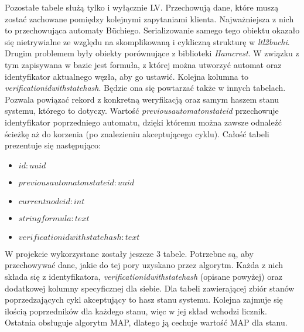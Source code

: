 Pozostałe tabele służą tylko i wyłącznie LV.
Przechowują dane, które muszą zostać zachowane pomiędzy kolejnymi zapytaniami klienta.
Najważniejsza z nich to przechowująca automaty Büchiego.
Serializowanie samego tego obiektu okazało się nietrywialne ze względu na skomplikowaną i cykliczną strukturę w \textit{ltl2buchi}.
Drugim problemem były obiekty porównujące z biblioteki \textit{Hamcrest}.
W związku z tym zapisywana w bazie jest formuła, z której można utworzyć automat oraz identyfikator aktualnego węzła, aby go ustawić.
Kolejna kolumna to \textit{verificationidwithstatehash}.
Będzie ona się powtarzać także w innych tabelach.
Pozwala powiązać rekord z konkretną weryfikacją oraz samym haszem stanu systemu, którego to dotyczy.
Wartość \textit{previousautomatonstateid} przechowuje identyfikator poprzedniego automatu, dzięki któremu można zawsze odnaleźć ścieżkę aż do korzenia (po znalezieniu akceptującego cyklu).
Całość tabeli prezentuje się następująco:
\begin{itemize}
    \setlength\itemsep{-0.1cm}
    \item $ id: uuid $
    \item $ previousautomatonstateid: uuid $
    \item $ currentnodeid: int $
    \item $ stringformula: text $
    \item $ verificationidwithstatehash: text $
\end{itemize}

W projekcie wykorzystane zostały jeszcze 3 tabele.
Potrzebne są, aby przechowywać dane, jakie do tej pory uzyskano przez algorytm.
Każda z nich składa się z identyfikatora, \textit{verificationidwithstatehash} (opisane powyżej) oraz dodatkowej kolumny specyficznej dla siebie.
Dla tabeli zawierającej zbiór stanów poprzedzających cykl akceptujący to hasz stanu systemu.
Kolejna zajmuje się ilością poprzedników dla każdego stanu, więc w jej skład wchodzi licznik.
Ostatnia obsługuje algorytm MAP, dlatego ją cechuje wartość MAP dla stanu.
